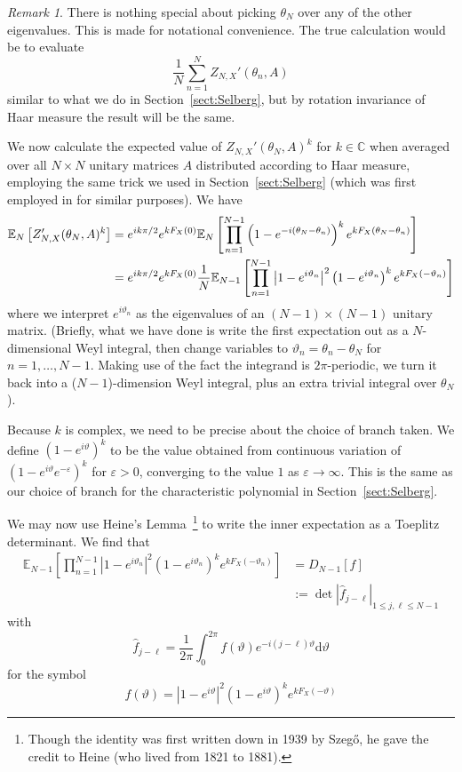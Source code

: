 \documentclass[12pt,a4paper,reqno]{amsart}
\theoremstyle{remark}
\newtheorem*{remark}{Remark}
\numberwithin{equation}{section}
\newcommand{\ii}{i}
\newcommand{\dd}{\mathrm{d}}
\newcommand{\E}{\mathbb{E}}
\newcommand{\CC}{\mathbb{C}}
\begin{document}
\begin{remark}
    There is nothing special about picking $\theta_N$ over any of the other eigenvalues. This is made for notational convenience. The true calculation would be to evaluate
    \[
    \frac{1}{N} \sum_{n=1}^N Z_{N,X}'(\theta_n,A)
    \]
    similar to what we do in Section~\ref{sect:Selberg}, but by rotation invariance of Haar measure the result will be the same.
\end{remark}

We now calculate the expected value of $Z_{N,X}'(\theta_N,A)^k$ for $k\in\CC$ when averaged over all $N\times N$ unitary matrices $A$ distributed according to Haar measure, employing the same trick we used in Section~\ref{sect:Selberg} (which was first employed in \cite{HKO00} for similar purposes). We have
\begin{align}
\E_{N} \left[ Z_{N,X}'(\theta_N,A)^k \right] &=  e^{\ii k \pi / 2} e^{k F_X(0)} \E_N\left[ \prod_{n=1}^{N-1} \left(1-e^{-\ii(\theta_N-\theta_n)} \right)^k e^{k F_X(\theta_N-\theta_n)}  \right] \notag\\
&= e^{\ii k \pi / 2} e^{k F_X(0)} \frac{1}{N} \E_{N-1} \left[ \prod_{n=1}^{N-1} \left|1-e^{\ii\vartheta_n}\right|^2  \left(1-e^{\ii \vartheta_n} \right)^k e^{k F_X(-\vartheta_n)} \right] \label{eq:MmtsZNX}
\end{align}
where we interpret $e^{\ii \vartheta_n}$ as the eigenvalues of an $(N-1) \times (N-1)$ unitary matrix. (Briefly, what we have done is write the first expectation out as a $N$-dimensional Weyl integral, then change variables to $\vartheta_n = \theta_n - \theta_N$ for $n=1,\dots,N-1$. Making use of the fact the integrand is $2\pi$-periodic, we turn it back into a ($N-1$)-dimension Weyl integral, plus an extra trivial integral over $\theta_N$).

Because $k$ is complex, we need to be precise about the choice of branch taken. We define $\left(1-e^{\ii \vartheta} \right)^k$ to be the value obtained from continuous variation of  $\left(1-e^{\ii \vartheta}e^{-\varepsilon} \right)^k$ for $\varepsilon>0$, converging to the value $1$ as $\varepsilon\to\infty$. This is the same as our choice of branch for the characteristic polynomial in Section~\ref{sect:Selberg}.

We may now use Heine's Lemma~\cite{Sze39}\footnote{Though the identity was first written down in 1939 by Szeg\H{o}, he gave the credit to Heine (who lived from 1821 to 1881).} to write the inner expectation as a Toeplitz determinant. We find that
\begin{align*}
\E_{N-1} \left[ \prod_{n=1}^{N-1} \left|1-e^{\ii\vartheta_n}\right|^2  \left(1-e^{\ii \vartheta_n} \right)^k e^{k F_X(-\vartheta_n)} \right] &= D_{N-1}[f] \\
&:= \det\left\vert \hat f_{j-\ell} \right|_{1 \leq j,\ell \leq N-1}
\end{align*}
with
\[
\hat f_{j-\ell} = \frac{1}{2\pi} \int_0^{2\pi} f(\vartheta) e^{-\ii (j-\ell) \vartheta} \dd \vartheta
\]
for the symbol
\begin{equation*}
f(\vartheta) = \left|1-e^{\ii\vartheta}\right|^2  \left(1-e^{\ii \vartheta} \right)^k e^{k F_X(-\vartheta)}
\end{equation*}
\end{document}
